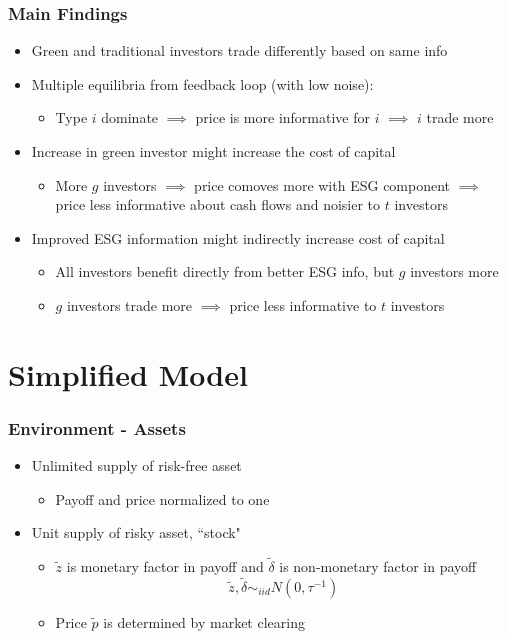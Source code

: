 \documentclass[handout]{beamer}
\begin{document}
\begin{frame}
\frametitle{Main Findings}
\begin{itemize}[<+->]
\item Green and traditional investors trade differently based on same info
\bigskip
\item Multiple equilibria from feedback loop (with low noise):
\begin{itemize}[<+->]
\item Type $i$ dominate $\implies$ price is more informative for $i$ $\implies$ $i$ trade more
\end{itemize}
\bigskip
\item Increase in green investor might increase the cost of capital
\begin{itemize}[<+->]
\item More $g$ investors $\implies$ price comoves more with ESG component $\implies$ price less informative about cash flows and noisier to $t$ investors
\end{itemize}
\bigskip
\item Improved ESG information might indirectly increase cost of capital
\begin{itemize}[<+->]
\item All investors benefit directly from better ESG info, but $g$ investors more
\item $g$ investors trade more $\implies$ price less informative to $t$ investors
\end{itemize}
\end{itemize}
\end{frame}


\section{Simplified Model}

\begin{frame}
\frametitle{Environment - Assets}
\begin{itemize}[<+->]
\item Unlimited supply of risk-free asset
\begin{itemize}[<+->]
\item Payoff and price normalized to one
\end{itemize}
\bigskip
\item Unit supply of risky asset, ``stock"
\begin{itemize}[<+->]
\item $\tilde z$ is monetary factor in payoff and $\tilde \delta$ is non-monetary factor in payoff
$$
\tilde z, \tilde \delta \sim_{iid} N(0, \tau^{-1})
$$
\item Price $\tilde p$ is determined by market clearing
\end{itemize}
\end{itemize}
\end{frame}
\end{document}
